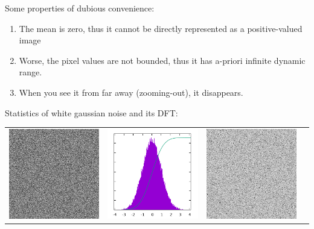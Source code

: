 Some properties of dubious convenience:
\begin{enumerate}
	\item The mean is zero, thus it cannot be directly represented as
		a positive-valued image
	\item Worse, the pixel values are not bounded, thus it has a-priori
		infinite dynamic range.
	\item When you see it from far away (zooming-out), it disappears.
\end{enumerate}



Statistics of white gaussian noise and its DFT:

\begin{tabular}{cccc}
	\includegraphics{w256.png} &
	\includegraphics{w256_h.png} &
	\includegraphics{w256_f.png} &

\end{tabular}
